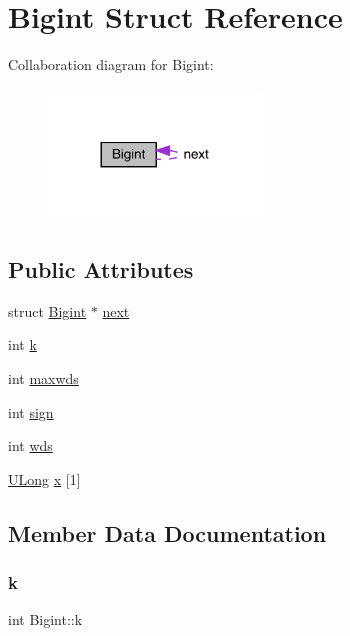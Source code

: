 \hypertarget{struct_bigint}{}\section{Bigint Struct Reference}
\label{struct_bigint}


Collaboration diagram for Bigint\+:\nopagebreak
\begin{figure}[H]
\begin{center}
\leavevmode
\includegraphics[width=161pt]{struct_bigint__coll__graph}
\end{center}
\end{figure}
\subsection*{Public Attributes}
\begin{DoxyCompactItemize}
\item 
struct \hyperlink{struct_bigint}{Bigint} $\ast$ \hyperlink{struct_bigint_a3a1296e26ef617e775d5e366e390e7fc}{next}
\item 
int \hyperlink{struct_bigint_a032d76e80da2f21df10c0794244d12f2}{k}
\item 
int \hyperlink{struct_bigint_a5ffcac6f95ded3bc1fc23204f46f10d0}{maxwds}
\item 
int \hyperlink{struct_bigint_a4380eb98f7653bb74d8377c0d68d6cb7}{sign}
\item 
int \hyperlink{struct_bigint_aa737992ebddb9d6a7e2d23bfecdb080e}{wds}
\item 
\hyperlink{dtoa_8c_afa5f820499f9d3fb566021c346784449}{U\+Long} \hyperlink{struct_bigint_ae56981315f471a190603887aee98ca99}{x} \mbox{[}1\mbox{]}
\end{DoxyCompactItemize}


\subsection{Member Data Documentation}
\mbox{\label{struct_bigint_a032d76e80da2f21df10c0794244d12f2}} 
\subsubsection{\texorpdfstring{k}{k}}
{\footnotesize\ttfamily int Bigint\+::k}

